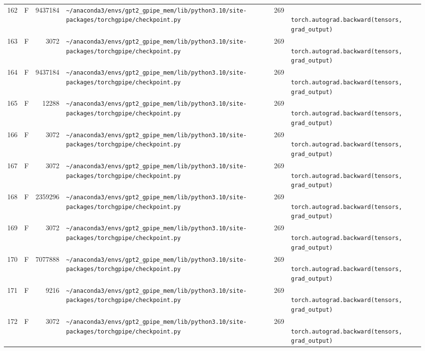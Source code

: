 \documentclass{article}
\begin{document}
\begin{longtable}{r l r p{6.5cm} r p{7.0cm}}
162 & F & 9437184 & \lstinline|~/anaconda3/envs/gpt2_gpipe_mem/lib/python3.10/site-packages/torchgpipe/checkpoint.py| & 269 & \lstinline|            torch.autograd.backward(tensors, grad_output)| \\
163 & F & 3072 & \lstinline|~/anaconda3/envs/gpt2_gpipe_mem/lib/python3.10/site-packages/torchgpipe/checkpoint.py| & 269 & \lstinline|            torch.autograd.backward(tensors, grad_output)| \\
164 & F & 9437184 & \lstinline|~/anaconda3/envs/gpt2_gpipe_mem/lib/python3.10/site-packages/torchgpipe/checkpoint.py| & 269 & \lstinline|            torch.autograd.backward(tensors, grad_output)| \\
165 & F & 12288 & \lstinline|~/anaconda3/envs/gpt2_gpipe_mem/lib/python3.10/site-packages/torchgpipe/checkpoint.py| & 269 & \lstinline|            torch.autograd.backward(tensors, grad_output)| \\
166 & F & 3072 & \lstinline|~/anaconda3/envs/gpt2_gpipe_mem/lib/python3.10/site-packages/torchgpipe/checkpoint.py| & 269 & \lstinline|            torch.autograd.backward(tensors, grad_output)| \\
167 & F & 3072 & \lstinline|~/anaconda3/envs/gpt2_gpipe_mem/lib/python3.10/site-packages/torchgpipe/checkpoint.py| & 269 & \lstinline|            torch.autograd.backward(tensors, grad_output)| \\
168 & F & 2359296 & \lstinline|~/anaconda3/envs/gpt2_gpipe_mem/lib/python3.10/site-packages/torchgpipe/checkpoint.py| & 269 & \lstinline|            torch.autograd.backward(tensors, grad_output)| \\
169 & F & 3072 & \lstinline|~/anaconda3/envs/gpt2_gpipe_mem/lib/python3.10/site-packages/torchgpipe/checkpoint.py| & 269 & \lstinline|            torch.autograd.backward(tensors, grad_output)| \\
170 & F & 7077888 & \lstinline|~/anaconda3/envs/gpt2_gpipe_mem/lib/python3.10/site-packages/torchgpipe/checkpoint.py| & 269 & \lstinline|            torch.autograd.backward(tensors, grad_output)| \\
171 & F & 9216 & \lstinline|~/anaconda3/envs/gpt2_gpipe_mem/lib/python3.10/site-packages/torchgpipe/checkpoint.py| & 269 & \lstinline|            torch.autograd.backward(tensors, grad_output)| \\
172 & F & 3072 & \lstinline|~/anaconda3/envs/gpt2_gpipe_mem/lib/python3.10/site-packages/torchgpipe/checkpoint.py| & 269 & \lstinline|            torch.autograd.backward(tensors, grad_output)| \\

\end{longtable}
\end{document}
